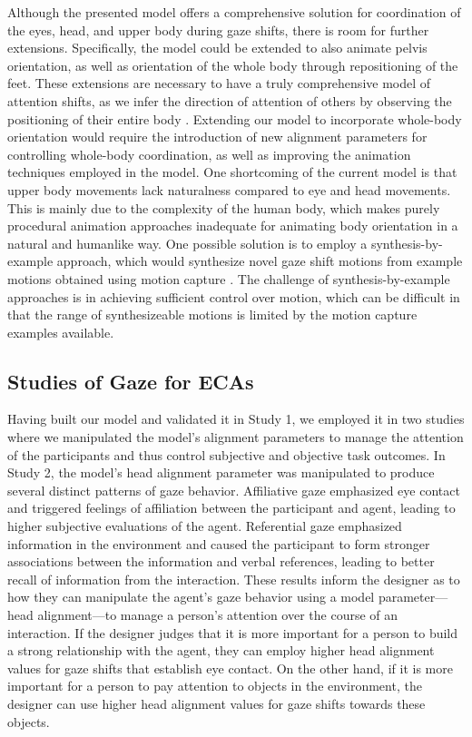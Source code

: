 Although the presented model offers a comprehensive solution for coordination of the eyes, head, and upper body during gaze shifts, there is room for further extensions. Specifically, the model could be extended to also animate pelvis orientation, as well as orientation of the whole body through repositioning of the feet. These extensions are necessary to have a truly comprehensive model of attention shifts, as we infer the direction of attention of others by observing the positioning of their entire body \cite{langton2000eyes,hietanen2002social,pomianowska2011socialcues}. Extending our model to incorporate whole-body orientation would require the introduction of new alignment parameters for controlling whole-body coordination, as well as improving the animation techniques employed in the model. One shortcoming of the current model is that upper body movements lack naturalness compared to eye and head movements. This is mainly due to the complexity of the human body, which makes purely procedural animation approaches inadequate for animating body orientation in a natural and humanlike way. One possible solution is to employ a synthesis-by-example approach, which would synthesize novel gaze shift motions from example motions obtained using motion capture \cite{pejsa2010sbe}. The challenge of synthesis-by-example approaches is in achieving sufficient control over motion, which can be difficult in that the range of synthesizeable motions is limited by the motion capture examples available.

\subsection{Studies of Gaze for ECAs}

Having built our model and validated it in Study 1, we employed it in two studies where we manipulated the model's alignment parameters to manage the attention of the participants and thus control subjective and objective task outcomes. In Study 2, the model's head alignment parameter was manipulated to produce several distinct patterns of gaze behavior. Affiliative gaze emphasized eye contact and triggered feelings of affiliation between the participant and agent, leading to higher subjective evaluations of the agent. Referential gaze emphasized information in the environment and caused the participant to form stronger associations between the information and verbal references, leading to better recall of information from the interaction. These results inform the designer as to how they can manipulate the agent's gaze behavior using a model parameter---head alignment---to manage a person's attention over the course of an interaction. If the designer judges that it is more important for a person to build a strong relationship with the agent, they can employ higher head alignment values for gaze shifts that establish eye contact. On the other hand, if it is more important for a person to pay attention to objects in the environment, the designer can use higher head alignment values for gaze shifts towards these objects.

